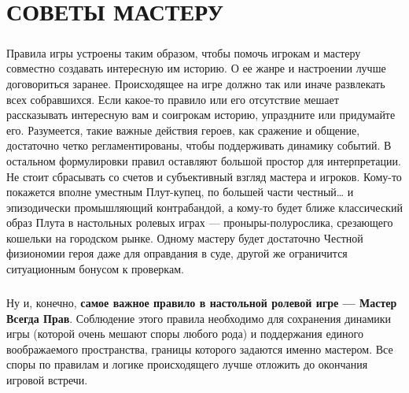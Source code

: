 \chapter{СОВЕТЫ МАСТЕРУ}
\paragraph{}
Правила игры устроены таким образом, чтобы помочь игрокам и мастеру совместно создавать интересную им историю. О ее жанре и настроении лучше договориться заранее. Происходящее на игре должно так или иначе развлекать всех собравшихся. Если какое-то правило или его отсутствие мешает рассказывать интересную вам и соигрокам историю, упраздните или придумайте его. Разумеется, такие важные действия героев, как сражение и общение, достаточно четко регламентированы, чтобы поддерживать динамику событий. В остальном формулировки правил оставляют большой простор для интерпретации. Не стоит сбрасывать со счетов и субъективный взгляд мастера и игроков. Кому-то покажется вполне уместным Плут-купец, по большей части честный… и эпизодически промышляющий контрабандой, а кому-то будет ближе классический образ Плута в настольных ролевых играх — проныры-полурослика, срезающего кошельки на городском рынке. Одному мастеру будет достаточно Честной физиономии героя даже для оправдания в суде, другой же ограничится ситуационным бонусом к проверкам.
\paragraph{}
Ну и, конечно, \textbf{самое важное правило в настольной ролевой игре — Мастер Всегда Прав}. Соблюдение этого правила необходимо для сохранения динамики игры (которой очень мешают споры любого рода) и поддержания единого воображаемого пространства, границы которого задаются именно мастером. Все споры по правилам и логике происходящего лучше отложить до окончания игровой встречи.




